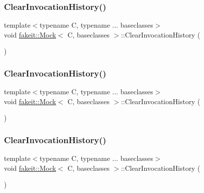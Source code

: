 \subsubsection{\texorpdfstring{ClearInvocationHistory()}{ClearInvocationHistory()}\hspace{0.1cm}{\footnotesize\ttfamily [4/9]}}
{\footnotesize\ttfamily template$<$typename C, typename ... baseclasses$>$ \\
void \mbox{\hyperlink{classfakeit_1_1Mock}{fakeit\+::\+Mock}}$<$ C, baseclasses $>$\+::Clear\+Invocation\+History (\begin{DoxyParamCaption}{ }\end{DoxyParamCaption})\hspace{0.3cm}{\ttfamily [inline]}}

\mbox{\label{classfakeit_1_1Mock_ac9e21ef9c73c735287c7fd3dd110aafc}} 
\subsubsection{\texorpdfstring{ClearInvocationHistory()}{ClearInvocationHistory()}\hspace{0.1cm}{\footnotesize\ttfamily [5/9]}}
{\footnotesize\ttfamily template$<$typename C, typename ... baseclasses$>$ \\
void \mbox{\hyperlink{classfakeit_1_1Mock}{fakeit\+::\+Mock}}$<$ C, baseclasses $>$\+::Clear\+Invocation\+History (\begin{DoxyParamCaption}{ }\end{DoxyParamCaption})\hspace{0.3cm}{\ttfamily [inline]}}

\mbox{\label{classfakeit_1_1Mock_ac9e21ef9c73c735287c7fd3dd110aafc}} 
\subsubsection{\texorpdfstring{ClearInvocationHistory()}{ClearInvocationHistory()}\hspace{0.1cm}{\footnotesize\ttfamily [6/9]}}
{\footnotesize\ttfamily template$<$typename C, typename ... baseclasses$>$ \\
void \mbox{\hyperlink{classfakeit_1_1Mock}{fakeit\+::\+Mock}}$<$ C, baseclasses $>$\+::Clear\+Invocation\+History (\begin{DoxyParamCaption}{ }\end{DoxyParamCaption})\hspace{0.3cm}{\ttfamily [inline]}}

